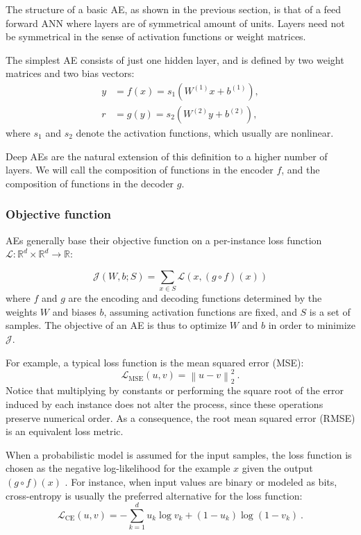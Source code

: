 The structure of a basic AE, as shown in the previous section, is that of a feed forward ANN where layers are of symmetrical amount of units. Layers need not be symmetrical in the sense of activation functions or weight matrices.

The simplest AE consists of just one hidden layer, and is defined by two weight matrices and two bias vectors:
\begin{align}
  y&=f(x)=s_1(W^{(1)}x+b^{(1)}),\\
  r&=g(y)=s_2(W^{(2)}y+b^{(2)}),
\end{align}
where $s_1$ and $s_2$ denote the activation functions, which usually are nonlinear.

Deep AEs are the natural extension of this definition to a higher number of layers. We will call the composition of functions in the encoder $f$, and the composition of functions in the decoder $g$.

\subsubsection{Objective function}

AEs generally base their objective function on a per-instance loss function $\mathcal L:\mathbb R^d\times \mathbb R^d\rightarrow \mathbb R$:

\begin{equation}
\mathcal J(W,b;S)= \sum_{x \in S} \mathcal L(x, (g\circ f)(x))
\end{equation}
where $f$ and $g$ are the encoding and decoding functions determined by the weights $W$ and biases $b$, assuming activation functions are fixed, and $S$ is a set of samples. The objective of an AE is thus to optimize $W$ and $b$ in order to minimize $\mathcal J$.

For example, a typical loss function is the mean squared error (MSE):
\begin{equation}
\mathcal L_{\mathrm{MSE}}(u, v)=\left\lVert u - v\right\rVert_2^2~.
\end{equation}
Notice that multiplying by constants or performing the square root of the error induced by each instance does not alter the process, since these operations preserve numerical order. As a consequence, the root mean squared error (RMSE) is an equivalent loss metric.

When a probabilistic model is assumed for the input samples, the loss function is chosen as the negative log-likelihood for the example $x$ given the output $(g\circ f)(x)$ . For instance, when input values are binary or modeled as bits, cross-entropy is usually the preferred alternative for the loss function:
\begin{equation}
  \mathcal L_{\mathrm{CE}}(u, v)=-\sum_{k=1}^d u_k \log v_k + (1 - u_k)\log(1 - v_k)~.
\end{equation}


